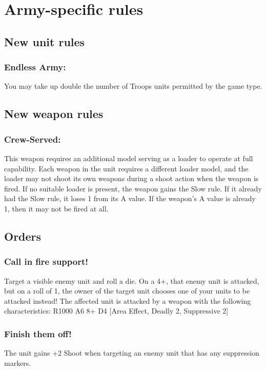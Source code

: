 \section*{Army-specific rules}

\subsection*{New unit rules}

\subsubsection*{Endless Army:} You may take up double the number of Troops units permitted by the game type.

\subsection*{New weapon rules}

\subsubsection*{Crew-Served:} This weapon requires an additional model serving as a loader to operate at full capability. Each weapon in the unit requires a different loader model, and the loader may not shoot its own weapons during a shoot action when the weapon is fired. If no suitable loader is present, the weapon gains the Slow rule. If it already had the Slow rule, it loses 1 from its A value. If the weapon's A value is already 1, then it may not be fired at all.

\subsection*{Orders}

\subsubsection*{Call in fire support!} Target a visible enemy unit and roll a die. On a 4+, that enemy unit is attacked, but on a roll of 1, the owner of the target unit chooses one of your units to be attacked instead! The affected unit is attacked by a weapon with the following characteristics: R1000 A6 8+ D4 [Area Effect, Deadly 2, Suppressive 2]

\subsubsection*{Finish them off!} The unit gains +2 Shoot when targeting an enemy unit that has any suppression markers.

